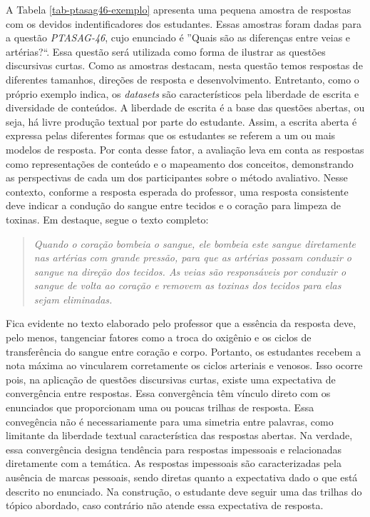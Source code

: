 A Tabela \ref{tab-ptasag46-exemplo} apresenta uma pequena amostra de respostas com os devidos indentificadores dos estudantes. Essas amostras foram dadas para a questão \textit{PTASAG-46}, cujo enunciado é ''Quais são as diferenças entre veias e artérias?``. Essa questão será utilizada como forma de ilustrar as questões discursivas curtas. Como as amostras destacam, nesta questão temos respostas de diferentes tamanhos, direções de resposta e desenvolvimento. Entretanto, como o próprio exemplo indica, os \textit{datasets} são característicos pela liberdade de escrita e diversidade de conteúdos. A liberdade de escrita é a base das questões abertas, ou seja, há livre produção textual por parte do estudante. Assim, a escrita aberta é expressa pelas diferentes formas que os estudantes se referem a um ou mais modelos de resposta. Por conta desse fator, a avaliação leva em conta as respostas como representações de conteúdo e o mapeamento dos conceitos, demonstrando as perspectivas de cada um dos participantes sobre o método avaliativo. Nesse contexto, conforme a resposta esperada do professor, uma resposta consistente deve indicar a condução do sangue entre tecidos e o coração para limpeza de toxinas. Em destaque, segue o texto completo: 

\begin{quote}
\textit{Quando o coração bombeia o sangue, ele bombeia este sangue diretamente nas artérias com grande pressão, para que as artérias possam conduzir o sangue na direção dos tecidos. As veias são responsáveis por conduzir o sangue de volta ao coração e removem as toxinas dos tecidos para elas sejam eliminadas.}
\end{quote}

Fica evidente no texto elaborado pelo professor que a essência da resposta deve, pelo menos, tangenciar fatores como a troca do oxigênio e os ciclos de transferência do sangue entre coração e corpo. Portanto, os estudantes recebem a nota máxima ao vincularem corretamente os ciclos arteriais e venosos. Isso ocorre pois, na aplicação de questões discursivas curtas, existe uma expectativa de convergência entre respostas. Essa convergência têm vínculo direto com os enunciados que proporcionam uma ou poucas trilhas de resposta. Essa convegência não é necessariamente para uma simetria entre palavras, como limitante da liberdade textual característica das respostas abertas. Na verdade, essa convergência designa tendência para respostas impessoais e relacionadas diretamente com a temática. As respostas impessoais são caracterizadas pela ausência de marcas pessoais, sendo diretas quanto a expectativa dado o que está descrito no enunciado. Na construção, o estudante deve seguir uma das trilhas do tópico abordado, caso contrário não atende essa expectativa de resposta.


